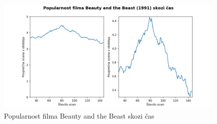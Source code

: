 \documentclass[a4paper,11pt]{article}
\begin{document}
\begin{figure}[htbp]
\begin{center}
\includegraphics[scale=0.6]{595-beauty.png}
\caption{Popularnost filma Beauty and the Beast skozi čas} \label{fig:img5}
\end{center}
\end{figure}



%
%
%
%
%
\end{document}
